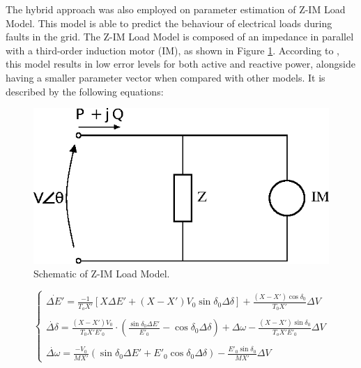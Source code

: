 The hybrid approach was also employed on parameter estimation of Z-IM Load Model. This model is able to predict the behaviour of electrical loads during faults in the grid. The Z-IM Load Model is composed of an impedance in parallel with a third-order induction motor (IM), as shown in Figure \ref{img: Z-IM}. According to \cite{Choi}, this model results in low error levels for both active and reactive power, alongside having a smaller parameter vector when compared with other models. It is described by the following equations:

\begin{figure}[h]
    \caption{Schematic of Z-IM Load Model.}
    \begin{center}
    	\includegraphics[scale=1]{Images/drawZIM.eps}
    \end{center}
    \label{img: Z-IM}
\end{figure}

\begin{equation}
    \begin{cases}
        \dot{\Delta E'} = \frac{-1}{T_{o}X'}[X\Delta E' + (X - X')V_{0}\sin\delta_{0}\Delta \delta] + \frac{(X - X')\cos\delta_{0}}{T_{0}X'}\Delta V \\
        \\
        \dot{\Delta \delta} = \frac{(X-X')V_{0}}{T_{0}X'E'_{0}}\cdot\left(\frac{\sin\delta_{0}\Delta E'}{E'_0} - \cos\delta_{0}\Delta\delta\right) + \Delta\omega - \frac{(X - X')\sin\delta_0}{T_o X'E'_0}\Delta V \\
        \\
        \dot{\Delta \omega} = \frac{-V_{0}}{MX'}(\sin\delta_{0}\Delta E' + E'_{0}\cos\delta_{0}\Delta\delta) - \frac{E'_0\sin\delta_0}{MX'}\Delta V
    \end{cases}
    \label{eq: xZIM}
\end{equation}

